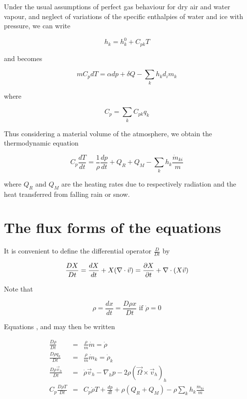 Under the usual assumptions of perfect gas behaviour for dry air and
water vapour, and neglect of variations of the specific enthalpies of
water and ice with pressure, we can write

\begin{equation}
\label{A.2.5.2}
h_{k}=h_{k}^0+C_{pk}T
\end{equation}

and  becomes

\begin{equation}
\label{A.2.5.3}
mC_{p}dT=\alpha dp +
\delta Q -\sum_{k}h_{k}d_{i}m_{k}
\end{equation}

where

\begin{equation}
\label{A.2.5.4}
C_{p}=\sum_{k} C_{pk}q_{k}
\end{equation}

Thus considering a material volume of the atmosphere, we obtain the
thermodynamic equation

\begin{equation}
\label{A.2.5.5}
C_{p}\frac{dT}{dt}=\frac{1}{\rho}\frac{dp}{dt} +Q_{R}+Q_{M}-\sum_{k}
h_{k}\frac{\dot{m}_{ki}}{m}
\end{equation}

where $Q_{R}$ and $Q_{M}$ are the heating rates due to respectively
radiation and the heat transferred from falling rain or snow.

\section{The flux forms of the equations}\label{sA.3}

It is convenient to define the differential operator $\frac{D}{Dt}$ by

\begin{equation}
\label{A.3.1}
\frac{DX}{Dt}=\frac{dX}{dt}+X(\nabla \cdot \vec{v})=\frac {\partial X} {\partial t}+\nabla \cdot (X \vec{v})
\end{equation}

Note that

\begin{equation}
\label{A.3.2}
\rho=\frac{dx}{dt}=\frac{D\rho x}{Dt} \mbox{ if } \dot{\rho} =0
\end{equation}

Equations ,  and  may then be
written

\begin{eqnarray}
\label{A.3.3}
\frac{D\rho}{Dt}&=&\frac{\rho}{m}\dot{m}=\dot{\rho}\\
\label{A.3.4}
\frac{D\rho q_{k}}{Dt}&=&\frac{\rho}{m}\dot{m}_{k}=\dot{\rho}_{k}\\
\label{A.3.5}
\frac{D\rho 
\vec{v}_{h}}{Dt}&=&\dot{\rho}\vec{v}_{h}-\nabla_{h}p-2\rho(\vec{\Omega} 
\times \vec{v}_{h})_{h}\\
\label{A.3.6}
C_{p}\frac{D\rho 
T}{Dt}&=&C_{p}\dot{\rho}T+\frac{dp}{dt}+\rho(Q_{R}+Q_{M})-\rho\sum_{k}
h_{k}\frac{\dot{m}_{ki}}{m}
\end{eqnarray}

